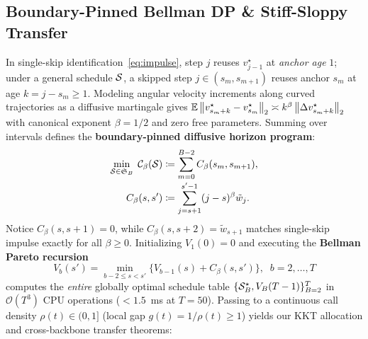 \subsection{Boundary-Pinned Bellman DP \& Stiff-Sloppy Transfer}
\label{sec:dp}

In single-skip identification~\eqref{eq:impulse}, step $j$ reuses $v_{j-1}^\star$ at \emph{anchor age} $1$; under a general schedule $\mathcal{S}$, a skipped step $j \in (s_m, s_{m+1})$ reuses anchor $s_m$ at age $k = j - s_m \ge 1$. Modeling angular velocity increments along curved trajectories as a diffusive martingale gives $\mathbb{E}\left\lVert v_{s_m+k}^\star - v_{s_m}^\star \right\rVert_2 \asymp k^\beta \left\lVert \Delta v_{s_m+k}^\star \right\rVert_2$ with canonical exponent $\beta = 1/2$ and zero free parameters. Summing over intervals defines the \textbf{boundary-pinned diffusive horizon program}:
\begin{equation}
\begin{aligned}
\min_{\mathcal{S} \in \mathfrak{S}_B}\; \mathcal{C}_\beta(\mathcal{S}) &\coloneqq \sum_{m=0}^{B-2} C_\beta(s_m, s_{m+1}), \\[-2pt]
C_\beta(s, s') &\coloneqq \sum_{j = s + 1}^{s' - 1} (j - s)^\beta \tilde{w}_j.
\end{aligned}
\label{eq:age_objective}
\end{equation}
Notice $C_\beta(s, s+1) = 0$, while $C_\beta(s, s+2) = \tilde{w}_{s+1}$ matches single-skip impulse exactly for all $\beta \ge 0$. Initializing $V_1(0) = 0$ and executing the \textbf{Bellman Pareto recursion}
\begin{equation}
V_b(s') = \min_{b - 2 \le s < s'} \bigl\{ V_{b-1}(s) + C_\beta(s, s') \bigr\}, \;\; b = 2, \dots, T
\label{eq:bellman_dp}
\end{equation}
computes the \emph{entire} globally optimal schedule table $\{\mathcal{S}_B^\star, V_B(T-1)\}_{B=2}^T$ in $\mathcal{O}(T^3)$ CPU operations ($< 1.5$~ms at $T=50$). Passing to a continuous call density $\rho(t) \in (0, 1]$ (local gap $g(t) = 1 / \rho(t) \ge 1$) yields our KKT allocation and cross-backbone transfer theorems:

